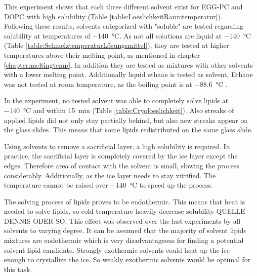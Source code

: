 This experiment shows that each three different solvent exist for EGG-PC and DOPC with high solubility (Table \ref{table:LoeslichkeitRaumtemperatur}). Following these results, solvents categorized with "soluble" are tested regarding solubility at temperatures of \SI{-140}{\degreeCelsius}. As not all solutions are liquid at \SI{-140}{\degreeCelsius} (Table \ref{table:SchmelztemperaturLösungsmittel}), they are tested at higher temperatures above their melting point, as mentioned in chapter \ref{chapter:meltingtemp}. In addition they are tested as mixtures with other solvents with a lower melting point. Additionally liquid ethane is tested as solvent. Ethane was not tested at room temperature, as the boiling point is at \SI{-88.6}{\degreeCelsius} \cite{PubChem.29.08.2023}.

In the experiment, no tested solvent was able to completely solve lipids at \SI{-140}{\degreeCelsius} and within \SI{15}{\minute} (Table \ref{table:Cryoloeslichkeit}). Also streaks of applied lipids did not only stay partially behind, but also new streaks appear on the glass slides. This means that some lipids redistributed on the same glass slide.

Using solvents to remove a sacrificial layer, a high solubility is required. In practice, the sacrificial layer is completely covered by the ice layer except the edges. Therefore area of contact with the solvent is small, slowing the process considerably. Additionally, as the ice layer needs to stay vitrified. The temperature cannot be raised over \SI{-140}{\degreeCelsius} to speed up the process.

The solving process of lipids proves to be endothermic. This means that heat is needed to solve lipids, so cold temperature heavily decrease solubility QUELLE DENNIS ODER SO. This effect was observed over the last experiments by all solvents to varying degree. It can be assumed that the majority of solvent lipids mixtures are endothermic which is very disadvantageous for finding a potential solvent lipid candidate. Strongly exothermic solvents could heat up the ice enough to crystallize the ice. So weakly exothermic solvents would be optimal for this task.

